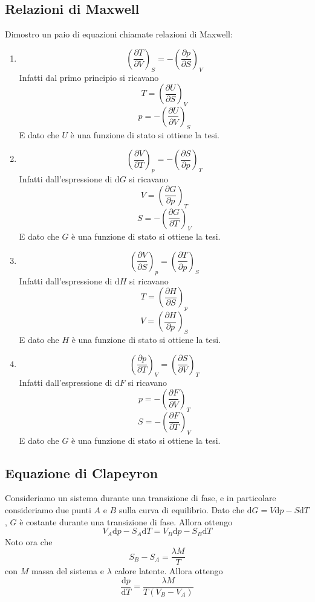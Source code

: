 \documentclass[a4paper,11pt]{article}
\begin{document}
\subsection{Relazioni di Maxwell}
Dimostro un paio di equazioni chiamate relazioni di Maxwell:
\begin{enumerate}

\item \[\left(\frac{\partial T}{\partial V}\right)_S=-\left(\frac{\partial p}{\partial S}\right)_V\]
Infatti dal primo principio si ricavano
\[T=\left(\frac{\partial U}{\partial S}\right)_V\]
\[p=-\left(\frac{\partial U}{\partial V}\right)_S\]
E dato che $U$ è una funzione di stato si ottiene la tesi.
\item \[\left(\frac{\partial V}{\partial T}\right)_p=-\left(\frac{\partial S}{\partial p}\right)_T\]
Infatti dall'espressione di $\mathrm{d}G$ si ricavano
\[V=\left(\frac{\partial G}{\partial p}\right)_T\]
\[S=-\left(\frac{\partial G}{\partial T}\right)_V\]
E dato che $G$ è una funzione di stato si ottiene la tesi.
\item \[\left(\frac{\partial V}{\partial S}\right)_p=\left(\frac{\partial T}{\partial p}\right)_S\]
Infatti dall'espressione di $\mathrm{d}H$ si ricavano
\[T=\left(\frac{\partial H}{\partial S}\right)_p\]
\[V=\left(\frac{\partial H}{\partial p}\right)_S\]
E dato che $H$ è una funzione di stato si ottiene la tesi.
\item \[\left(\frac{\partial p}{\partial T}\right)_V=\left(\frac{\partial S}{\partial V}\right)_T\]
Infatti dall'espressione di $\mathrm{d}F$ si ricavano
\[p=-\left(\frac{\partial F}{\partial V}\right)_T\]
\[S=-\left(\frac{\partial F}{\partial T}\right)_V\]
E dato che $G$ è una funzione di stato si ottiene la tesi.
\end{enumerate}

\subsection{Equazione di Clapeyron}
Consideriamo un sistema durante una transizione di fase, e in particolare consideriamo due punti $A$ e $B$ sulla curva di equilibrio. Dato che $\mathrm{d}G=V\mathrm{d}p-S\mathrm{d}T$, $G$ è costante durante una transizione di fase. Allora ottengo
\[V_A\mathrm{d}p-S_A\mathrm{d}T=V_B\mathrm{d}p-S_B\mathrm{d}T\]
Noto ora che 
\[S_B-S_A=\frac{\lambda M}{T}\]
con $M$ massa del sistema e $\lambda$ calore latente. Allora ottengo
\[\frac{\mathrm{d}p}{\mathrm{d}T}=\frac{\lambda M}{T\left(V_B-V_A\right)}\]
\end{document}
